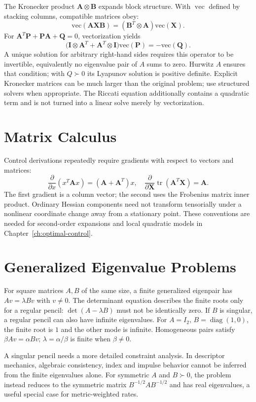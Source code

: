 \documentclass[10pt,letterpaper,openany]{book}
\theoremstyle{plain}
\theoremstyle{definition}
\theoremstyle{remark}
\newcommand{\trace}{\operatorname{tr}}
\renewcommand{\mat}[1]{\mathbf{#1}}
\begin{document}
The Kronecker product $\mat{A}\otimes\mat{B}$ expands block structure. With
$\operatorname{vec}$ defined by stacking columns, compatible matrices obey:
\[
\mathrm{vec}(\mat{A}\mat{X}\mat{B})
=(\mat{B}^T\otimes\mat{A})\mathrm{vec}(\mat{X}).
\]
For $\mat{A}^T\mat{P}+\mat{P}\mat{A}+\mat{Q}=0$, vectorization yields
\[
\big(\mat{I}\otimes\mat{A}^T+\mat{A}^T\otimes\mat{I}\big)\mathrm{vec}(\mat{P})
=-\mathrm{vec}(\mat{Q}).
\]
A unique solution for arbitrary right-hand sides requires this operator to be
invertible, equivalently no eigenvalue pair of $A$ sums to zero. Hurwitz $A$
ensures that condition; with $Q\succ0$ its Lyapunov solution is positive definite.
Explicit Kronecker matrices can be much larger than the original problem; use
structured solvers when appropriate. The Riccati equation additionally contains
a quadratic term and is not turned into a linear solve merely by vectorization.

\section{Matrix Calculus}

Control derivations repeatedly require gradients with respect to vectors and matrices:
\[
\frac{\partial}{\partial x}(x^T\mat{A}x)=(\mat{A}+\mat{A}^T)x,\quad
\frac{\partial}{\partial \mat{X}}\trace(\mat{A}^T\mat{X})=\mat{A}.
\]
The first gradient is a column vector; the second uses the Frobenius matrix
inner product. Ordinary Hessian components need not transform tensorially under
a nonlinear coordinate change away from a stationary point. These conventions
are needed for second-order expansions and local quadratic models in
Chapter~\ref{ch:optimal-control}.

\section{Generalized Eigenvalue Problems}

For square matrices $A,B$ of the same size, a finite generalized eigenpair has
$Av=\lambda Bv$ with $v\ne0$. The determinant equation describes the finite roots
only for a regular pencil: $\det(A-\lambda B)$ must not be identically zero.
If $B$ is singular, a regular pencil can also have infinite eigenvalues. For
$A=I_2$, $B=\operatorname{diag}(1,0)$, the finite root is $1$ and the other
mode is infinite. Homogeneous pairs satisfy $\beta Av=\alpha Bv$;
$\lambda=\alpha/\beta$ is finite when $\beta\ne0$.

A singular pencil needs a more detailed constraint analysis. In descriptor
mechanics, algebraic consistency, index and impulse behavior cannot be inferred
from the finite eigenvalues alone. For symmetric $A$ and $B\succ0$, the problem
instead reduces to the symmetric matrix $B^{-1/2}AB^{-1/2}$ and has real
eigenvalues, a useful special case for metric-weighted rates.
\end{document}
